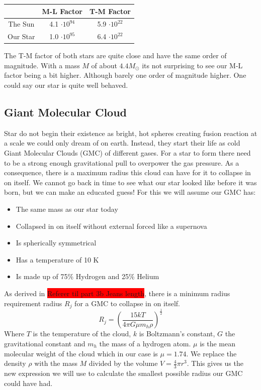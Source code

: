 \documentclass[reprint,english,notitlepage]{revtex4-2}
\begin{document}
\begin{center}
  \begin{tabular}{|c|*{2}{c|}}
    \hline
     &M-L Factor  &T-M Factor  \\
    \hline
    The Sun  &4.1 $ ⋅ 10^{94} $ &5.9 $ ⋅ 10^{22} $ \\
    \hline
    Our Star  &1.0 $ ⋅ 10^{95} $ &6.4 $ ⋅ 10^{22} $ \\
    \hline
    \end{tabular}
\end{center}
The T-M factor of both stars are quite close and have the same order of magnitude. With a mass $ M $ of about $ 4.4 M_{⊙} $ its not surprising to see our M-L factor being a bit higher. Although barely one order of magnitude higher. One could say our star is quite well behaved. 

\subsection{Giant Molecular Cloud}
Star do not begin their existence as bright, hot spheres creating fusion reaction at a scale we could only dream of on earth. Instead, they start their life as cold Giant Molecular Clouds (GMC) of different gases. For a star to form there need to be a strong enough gravitational pull to overpower the gas pressure. As a consequence, there is a maximum radius this cloud can have for it to collapse in on itself. We cannot go back in time to see what our star looked like before it was born, but we can make an educated guess! For this we will assume our GMC has:
\begin{itemize}
  \item The same mass as our star today
  \item Collapsed in on itself without external forced like a supernova
  \item Is spherically symmetrical
  \item Has a temperature of 10 K
  \item Is made up of 75\% Hydrogen and 25\% Helium
\end{itemize} 
As derived in \colorbox{red}{Referer til part 3b Jeans length}, there is a minimum radius requirement radius $ R_j $ for a GMC to collapse in on itself. 
\begin{equation}
  R_j = \left( \frac{15kT }{4 π G μ m_h ρ} \right) ^{\frac{1}{2}}
\end{equation}
Where $ T $ is the temperature of the cloud, $ k $ is Boltzmann's constant, $ G $ the gravitational constant and $ m_h $ the mass of a hydrogen atom. $ μ $ is the mean molecular weight of the cloud which in our case is $ μ = 1.74 $. We replace the density $ ρ $ with the mass $ M $ divided by the volume $ V = \frac{4}{3} π r^{3} $. This gives us the new expression we will use to calculate the smallest possible radius our GMC could have had. 
\end{document}
